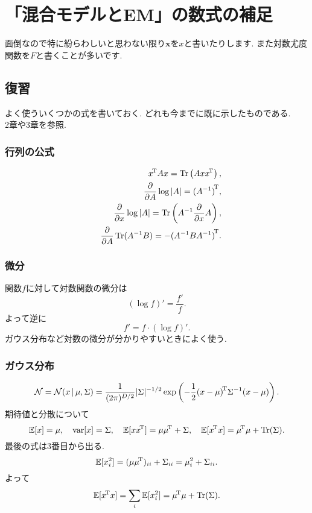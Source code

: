 \setcounter{chapter}{8}
\chapter{「混合モデルとEM」の数式の補足}
面倒なので特に紛らわしいと思わない限り$\bm{x}$を$x$と書いたりします. また対数尤度関数を$F$と書くことが多いです.

\newcommand{\wji}{w_{ji}^{(1)}}
\newcommand{\wkj}{w_{kj}^{(2)}}

\section{復習}
よく使ういくつかの式を書いておく. どれも今までに既に示したものである.\\
2章や3章を参照.

\subsection{行列の公式}
\begin{eqnarray*}
&& {x}^{\!\mathrm{T}} A {x}=\mathop{\mathrm{Tr}}\nolimits\left(Ax{x}^{\!\mathrm{T}}\right),\\
&& \frac{\partial}{\partial A}\log|A|={(A^{-1})}^{\!\mathrm{T}},\\
&& \frac{\partial}{\partial x}\log|A|=\mathop{\mathrm{Tr}}\nolimits\left(A^{-1}\frac{\partial}{\partial x}A\right),\\
&& \frac{\partial}{\partial A}\mathop{\mathrm{Tr}}\nolimits(A^{-1}B) = -{(A^{-1}BA^{-1})}^{\!\mathrm{T}}.
\end{eqnarray*}
\vspace{0pt}

\subsection{微分}
関数$f$に対して対数関数の微分は
$$
(\log f)'=\frac{f'}{f}.
$$
よって逆に
$$
f'=f \cdot (\log f)'.
$$
ガウス分布など対数の微分が分かりやすいときによく使う.

\subsection{ガウス分布}
$$
{\cal N} = {\cal N}(x\,|\,\mu,\Sigma)=\frac{1}{(2\pi)^{D/2}}|\Sigma|^{-1/2}\exp\left(-\frac{1}{2}{(x-\mu)}^{\!\mathrm{T}} {\Sigma^{-1}} {(x-\mu)}\right).
$$
期待値と分散について
$$
\mathbb{E}[x]=\mu, \quad \mathop{\mathrm{var}}\nolimits[x]=\Sigma, \quad
 \mathbb{E}[x{x}^{\!\mathrm{T}}]=\mu{\mu}^{\!\mathrm{T}}+\Sigma, \quad \mathbb{E}[{x}^{\!\mathrm{T}}x]={\mu}^{\!\mathrm{T}}\mu+\mathop{\mathrm{Tr}}\nolimits(\Sigma).
$$
最後の式は3番目から出る.
$$
\mathbb{E}[x_i^2]=(\mu{\mu}^{\!\mathrm{T}})_{ii}+\Sigma_{ii}=\mu_i^2+\Sigma_{ii}.
$$
よって
$$
\mathbb{E}[{x}^{\!\mathrm{T}}x]=\sum_i \mathbb{E}[x_i^2]={\mu}^{\!\mathrm{T}}\mu+\mathop{\mathrm{Tr}}\nolimits(\Sigma).
$$
\vspace{0pt}

